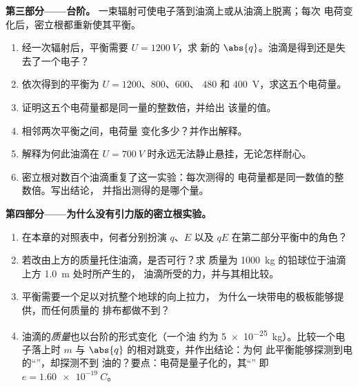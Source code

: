 \begin{problem}
\medskip
\noindent\textbf{第三部分——台阶。}
一束辐射可使电子落到油滴上或从油滴上脱离；每次
电荷变化后，密立根都重新使其平衡。
\begin{enumerate}[resume]
  \item 经一次辐射后，平衡需要 $U = \qty{1200}{V}$，求
        新的 $\abs{q}$。油滴是得到还是失去了一个电子？
  \item 依次得到的平衡为 $U = 1200$、$800$、$600$、
        $480$ 和 \qty{400}{V}，求这五个电荷量。
  \item 证明这五个电荷量都是同一量的整数倍，并给出
        该量的值。
  \item 相邻两次平衡之间，电荷量
        变化多少？并作出解释。
  \item 解释为何此油滴在
        $U = \qty{700}{V}$ 时永远无法静止悬挂，无论怎样耐心。
  \item 密立根对数百个油滴重复了这一实验：每次测得的
        电荷量都是同一数值的整数倍。写出结论，
        并指出测得的是哪个量。
\end{enumerate}

\medskip
\noindent\textbf{第四部分——为什么没有引力版的密立根实验。}
\begin{enumerate}[resume]
  \item 在本章的对照表中，何者分别扮演 $q$、$E$
        以及 $qE$ 在第二部分平衡中的角色？
  \item 若改由上方的质量托住油滴，是否可行？求
        质量为 \qty{1000}{kg} 的铅球位于油滴上方 \qty{1.0}{m} 处时所产生的，
        油滴所受的力，并与其相比较。
  \item 平衡需要一个足以对抗整个地球的向上拉力，
        为什么一块带电的极板能够提供，而任何质量的
        排布都做不到？
  \item 油滴的\emph{质量}也以台阶的形式变化（一个油
        约为 \qty{5e-25}{kg}）。比较一个电子落上时
        $m$ 与 $\abs{q}$ 的相对跳变，并作出结论：为何
        此平衡能够探测到电的“”，却探测不到
        油的？要点：电荷是量子化的，其“”
        即 $e = \qty{1.60e-19}{C}$。
\end{enumerate}
\end{problem}
